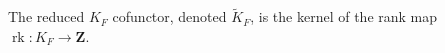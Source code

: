 The reduced $K_F$ cofunctor, denoted $\tilde{K}_F$, is the kernel of the rank map $\operatorname{rk}: K_F \to \mathbf{Z}$.
